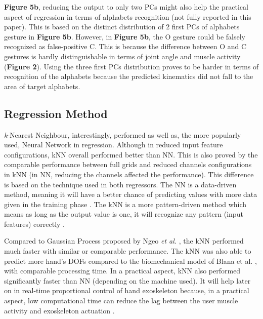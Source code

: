 \documentclass[conference]{IEEEtran}
\begin{document}
\textbf{Figure 5b}, reducing the output to only two PCs might also help the practical aspect of regression in terms 
of alphabets recognition (not fully reported in this paper). This is based on the distinct distribution of 2 first 
PCs of alphabets gesture in \textbf{Figure 5b}. However, in \textbf{Figure 5b}, the O gesture could be falsely recognized as 
false-positive C. This is because the difference between O and C gestures is hardly distinguishable in terms 
of joint angle and muscle activity (\textbf{Figure 2}). Using the three first PCs distribution proves to be 
harder in terms of recognition of the alphabets because the predicted kinematics did not fall to the area of 
target alphabets.

\subsection{Regression Method}
\textit{k}-Nearest Neighbour, interestingly, performed as well as, the more popularly used, Neural Network in 
regression. Although in reduced input feature configurations, kNN overall performed better than NN. This
is also proved by the comparable performance between full grids and reduced channels configurations in 
kNN (in NN, reducing the channels affected the performance). This difference is based on the technique used in both regressors. The NN is a data-driven method, meaning it will have a better chance of predicting 
values with more data given in the training phase \cite{b16}. The kNN is a more pattern-driven method which means 
as long as the output value is one, it will recognize any pattern (input features) correctly \cite{b35}.

Compared to Gaussian Process proposed by Ngeo \textit{et al.} \cite{b16}, the kNN performed much faster with 
similar or comparable performance. The kNN was also able to predict more hand’s DOFs compared to the 
biomechanical model of Blana et al. \cite{b20}, with comparable processing time. In a practical aspect, kNN also 
performed significantly faster than NN (depending on the machine used). It will help later on in real-time 
proportional control of hand exoskeleton because, in a practical aspect, low computational time can reduce the 
lag between the user muscle activity and exoskeleton actuation \cite{b20}.
\end{document}
